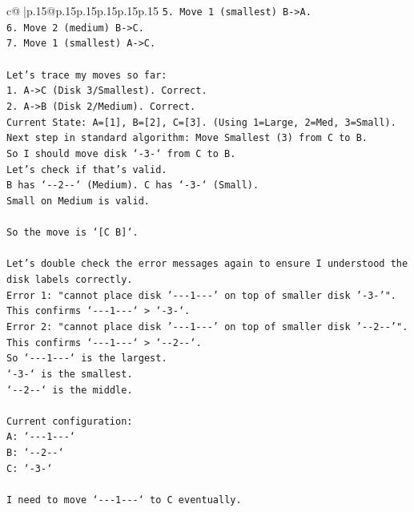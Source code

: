 \documentclass{article}
\begin{document}
{\begin{supertabular}{c@{$\;$}|p{.15\linewidth}@{}p{.15\linewidth}p{.15\linewidth}p{.15\linewidth}p{.15\linewidth}p{.15\linewidth}}
{{{\texttt{5. Move 1 (smallest) B{-}>A.} \\
\texttt{6. Move 2 (medium) B{-}>C.} \\
\texttt{7. Move 1 (smallest) A{-}>C.} \\
\\ 
\texttt{Let's trace my moves so far:} \\
\texttt{1. A{-}>C (Disk 3/Smallest). Correct.} \\
\texttt{2. A{-}>B (Disk 2/Medium). Correct.} \\
\texttt{Current State: A={[}1{]}, B={[}2{]}, C={[}3{]}. (Using 1=Large, 2=Med, 3=Small).} \\
\texttt{Next step in standard algorithm: Move Smallest (3) from C to B.} \\
\texttt{So I should move disk `{-}3{-}` from C to B.} \\
\texttt{Let's check if that's valid.} \\
\texttt{B has `{-}{-}2{-}{-}` (Medium). C has `{-}3{-}` (Small).} \\
\texttt{Small on Medium is valid.} \\
\\ 
\texttt{So the move is `{[}C B{]}`.} \\
\\ 
\texttt{Let's double check the error messages again to ensure I understood the disk labels correctly.} \\
\texttt{Error 1: "cannot place disk '{-}{-}{-}1{-}{-}{-}' on top of smaller disk '{-}3{-}'".} \\
\texttt{This confirms `{-}{-}{-}1{-}{-}{-}` > `{-}3{-}`.} \\
\texttt{Error 2: "cannot place disk '{-}{-}{-}1{-}{-}{-}' on top of smaller disk '{-}{-}2{-}{-}'".} \\
\texttt{This confirms `{-}{-}{-}1{-}{-}{-}` > `{-}{-}2{-}{-}`.} \\
\texttt{So `{-}{-}{-}1{-}{-}{-}` is the largest.} \\
\texttt{`{-}3{-}` is the smallest.} \\
\texttt{`{-}{-}2{-}{-}` is the middle.} \\
\\ 
\texttt{Current configuration:} \\
\texttt{A: `{-}{-}{-}1{-}{-}{-}`} \\
\texttt{B: `{-}{-}2{-}{-}`} \\
\texttt{C: `{-}3{-}`} \\
\\ 
\texttt{I need to move `{-}{-}{-}1{-}{-}{-}` to C eventually.} \\
}}}
\end{supertabular}}
\end{document}

